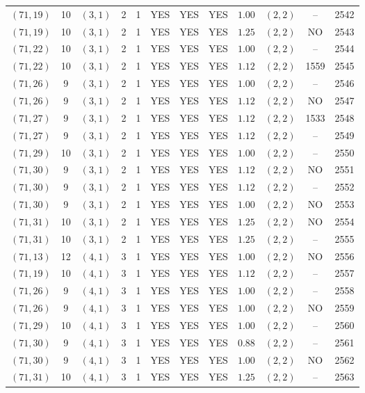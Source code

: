 \begin{longtable}{|c|c|c|c|c|c|c|c|c|c|c|c|}
$(71,19)$ & 10 & $(3,1)$ & 2 & 1 & YES & YES & YES & $1.00$ & $(2,2)$ & -- & 2542\\
$(71,19)$ & 10 & $(3,1)$ & 2 & 1 & YES & YES & YES & $1.25$ & $(2,2)$ & NO & 2543\\
$(71,22)$ & 10 & $(3,1)$ & 2 & 1 & YES & YES & YES & $1.00$ & $(2,2)$ & -- & 2544\\
$(71,22)$ & 10 & $(3,1)$ & 2 & 1 & YES & YES & YES & $1.12$ & $(2,2)$ & 1559 & 2545\\
$(71,26)$ & 9 & $(3,1)$ & 2 & 1 & YES & YES & YES & $1.00$ & $(2,2)$ & -- & 2546\\
$(71,26)$ & 9 & $(3,1)$ & 2 & 1 & YES & YES & YES & $1.12$ & $(2,2)$ & NO & 2547\\
$(71,27)$ & 9 & $(3,1)$ & 2 & 1 & YES & YES & YES & $1.12$ & $(2,2)$ & 1533 & 2548\\
$(71,27)$ & 9 & $(3,1)$ & 2 & 1 & YES & YES & YES & $1.12$ & $(2,2)$ & -- & 2549\\
$(71,29)$ & 10 & $(3,1)$ & 2 & 1 & YES & YES & YES & $1.00$ & $(2,2)$ & -- & 2550\\
$(71,30)$ & 9 & $(3,1)$ & 2 & 1 & YES & YES & YES & $1.12$ & $(2,2)$ & NO & 2551\\
$(71,30)$ & 9 & $(3,1)$ & 2 & 1 & YES & YES & YES & $1.12$ & $(2,2)$ & -- & 2552\\
$(71,30)$ & 9 & $(3,1)$ & 2 & 1 & YES & YES & YES & $1.00$ & $(2,2)$ & NO & 2553\\
$(71,31)$ & 10 & $(3,1)$ & 2 & 1 & YES & YES & YES & $1.25$ & $(2,2)$ & NO & 2554\\
$(71,31)$ & 10 & $(3,1)$ & 2 & 1 & YES & YES & YES & $1.25$ & $(2,2)$ & -- & 2555\\
$(71,13)$ & 12 & $(4,1)$ & 3 & 1 & YES & YES & YES & $1.00$ & $(2,2)$ & NO & 2556\\
$(71,19)$ & 10 & $(4,1)$ & 3 & 1 & YES & YES & YES & $1.12$ & $(2,2)$ & -- & 2557\\
$(71,26)$ & 9 & $(4,1)$ & 3 & 1 & YES & YES & YES & $1.00$ & $(2,2)$ & -- & 2558\\
$(71,26)$ & 9 & $(4,1)$ & 3 & 1 & YES & YES & YES & $1.00$ & $(2,2)$ & NO & 2559\\
$(71,29)$ & 10 & $(4,1)$ & 3 & 1 & YES & YES & YES & $1.00$ & $(2,2)$ & -- & 2560\\
$(71,30)$ & 9 & $(4,1)$ & 3 & 1 & YES & YES & YES & $0.88$ & $(2,2)$ & -- & 2561\\
$(71,30)$ & 9 & $(4,1)$ & 3 & 1 & YES & YES & YES & $1.00$ & $(2,2)$ & NO & 2562\\
$(71,31)$ & 10 & $(4,1)$ & 3 & 1 & YES & YES & YES & $1.25$ & $(2,2)$ & -- & 2563\\

\end{longtable}

